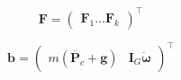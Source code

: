 \documentclass{article}
\renewcommand{\vec}[1]{\mathbf{#1}}
\begin{document}
\begin{equation}
    \vec{F}=
    \begin{pmatrix}
        \vec{F}_{1} \dots \vec{F}_{k}
    \end{pmatrix}
    ^\top
    \label{<+label+>}
\end{equation}


\begin{equation}
    \vec{b}= 
    \begin{pmatrix}
        m(\ddot{\vec{P}_c} + \vec{g}) & \vec{I}_G \dot{\vec{\omega}}
    \end{pmatrix}
    ^\top
    \label{<+label+>}
\end{equation}
\end{document}
